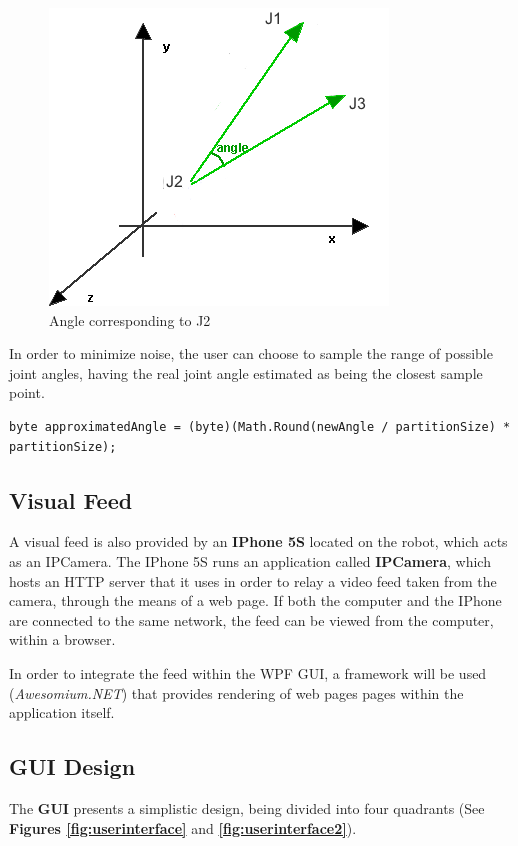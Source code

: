 \documentclass[12p,a4paper]{report}
\begin{document}
\begin{figure}
\begin{center}
\includegraphics{angle}
\caption{Angle corresponding to J2}
\label{fig:angle}
\end{center}
\end{figure}

In order to minimize noise, the user can choose to sample the range of possible joint angles, having the real joint angle estimated as being the closest sample point. 

\begin{verbatim}
byte approximatedAngle = (byte)(Math.Round(newAngle / partitionSize) * partitionSize);
\end{verbatim}

\subsection{Visual Feed}
A visual feed is also provided by an \textbf{IPhone 5S} located on the robot, which acts as an IPCamera. The IPhone 5S runs an application called \textbf{IPCamera}, which hosts an HTTP server that it uses in order to relay a video feed taken from the camera, through the means of a web page. If both the computer and the IPhone are connected to the same network, the feed can be viewed from the computer, within a browser.

In order to integrate the feed within the WPF GUI, a framework will be used (\emph{Awesomium.NET}) that provides rendering of web pages pages within the application itself.

\subsection{GUI Design}
The \textbf{GUI} presents a simplistic design, being divided into four quadrants (See \textbf{Figures \ref{fig:userinterface}} and \textbf{\ref{fig:userinterface2}}).
\end{document}
